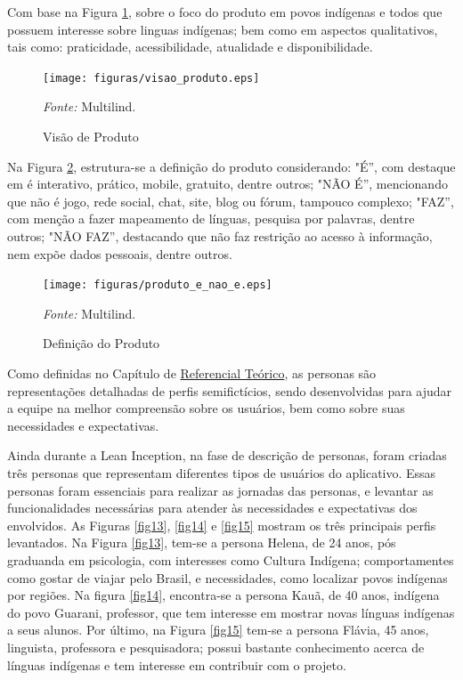 Com base na Figura \ref{fig11}, sobre o foco do produto em povos indígenas e todos que possuem interesse sobre linguas indígenas; bem como em aspectos qualitativos, tais como: praticidade, acessibilidade, atualidade 
e disponibilidade. 

\begin{figure}[h!]
	\centering
	\caption{Visão de Produto}
	\begin{adjustbox}{center}
		\texttt{[image: figuras/visao\_produto.eps]}
	\end{adjustbox}
	\begin{tablenotes}[flushleft]
		\centering
		\item \textit{Fonte:} Multilind.
	\end{tablenotes}
	\label{fig11}
\end{figure}
Na Figura \ref{fig12}, estrutura-se a definição do produto considerando: "É'', com destaque em é interativo, prático, mobile, gratuito, dentre outros; "NÃO É'', mencionando que não é jogo, rede social, chat, site, blog ou fórum, tampouco complexo; "FAZ'', com menção a fazer mapeamento de línguas, 
pesquisa por palavras, dentre outros; "NÃO FAZ'', destacando que não faz restrição ao acesso à informação, nem expõe dados pessoais, dentre outros.

\begin{figure}[h!]
	\centering
	\caption{Definição do Produto}
	\begin{adjustbox}{center}
		\texttt{[image: figuras/produto\_e\_nao\_e.eps]}
	\end{adjustbox}
	\begin{tablenotes}[flushleft]
		\centering
		\item \textit{Fonte:} Multilind.
	\end{tablenotes}
	\label{fig12}
\end{figure}

Como definidas no Capítulo de \hyperref[chap:Referencial]{Referencial Teórico}, as personas são representações detalhadas de perfis semifictícios, sendo desenvolvidas para ajudar a equipe na melhor compreensão sobre os usuários, bem 
como sobre suas necessidades e expectativas. 

Ainda durante a Lean Inception, na fase de descrição de personas, foram criadas três personas que representam diferentes tipos de usuários do aplicativo. Essas personas foram essenciais para realizar as jornadas das personas, e levantar as 
funcionalidades necessárias para atender às necessidades e expectativas dos envolvidos. As Figuras \ref{fig13}, \ref{fig14} e \ref{fig15} mostram os três principais perfis levantados.  Na Figura \ref{fig13}, tem-se a persona Helena, de 24 anos, pós 
graduanda em psicologia, com interesses como Cultura Indígena; comportamentes como gostar de viajar pelo Brasil, e necessidades, como localizar povos indígenas por regiões. Na figura \ref{fig14}, encontra-se a persona Kauã, de 40 anos, indígena do povo 
Guarani, professor, que tem interesse em mostrar novas línguas indígenas a seus alunos. Por último, na Figura \ref{fig15} tem-se a persona Flávia, 45 anos, linguista, professora e pesquisadora; possui bastante conhecimento acerca de línguas indígenas e 
tem interesse em contribuir com o projeto.

